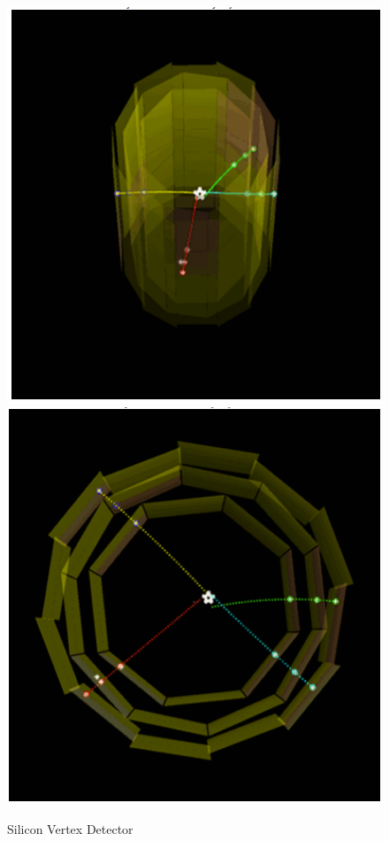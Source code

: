 \documentclass[12pt,a4paper]{article}
\begin{document}
\begin{figure}[h]

\includegraphics[scale=0.4]{detector}
\hspace{15mm}
\includegraphics[scale=0.4]{detector-2}
\caption{Silicon Vertex Detector}
\end{figure}
\end{document}
